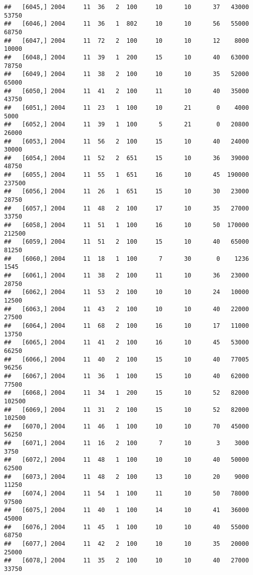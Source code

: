 \documentclass{article}\usepackage[]{graphicx}\usepackage[]{color}
\makeatletter
\newenvironment{kframe}{%
 \def\at@end@of@kframe{}%
 \ifinner\ifhmode%
  \def\at@end@of@kframe{\end{minipage}}%
  \begin{minipage}{\columnwidth}%
 \fi\fi%
 \def\FrameCommand##1{\hskip\@totalleftmargin \hskip-\fboxsep
 \colorbox{shadecolor}{##1}\hskip-\fboxsep
     \hskip-\linewidth \hskip-\@totalleftmargin \hskip\columnwidth}%
 \MakeFramed {\advance\hsize-\width
   \@totalleftmargin\z@ \linewidth\hsize
   \@setminipage}}%
 {\par\unskip\endMakeFramed%
 \at@end@of@kframe}
\newenvironment{knitrout}{}{} %
\makeatother
\begin{document}
\begin{knitrout}
\begin{kframe}
\begin{verbatim}
##   [6045,] 2004     11  36   2  100     10      10      37   43000   53750
##   [6046,] 2004     11  36   1  802     10      10      56   55000   68750
##   [6047,] 2004     11  72   2  100     10      10      12    8000   10000
##   [6048,] 2004     11  39   1  200     15      10      40   63000   78750
##   [6049,] 2004     11  38   2  100     10      10      35   52000   65000
##   [6050,] 2004     11  41   2  100     11      10      40   35000   43750
##   [6051,] 2004     11  23   1  100     10      21       0    4000    5000
##   [6052,] 2004     11  39   1  100      5      21       0   20800   26000
##   [6053,] 2004     11  56   2  100     15      10      40   24000   30000
##   [6054,] 2004     11  52   2  651     15      10      36   39000   48750
##   [6055,] 2004     11  55   1  651     16      10      45  190000  237500
##   [6056,] 2004     11  26   1  651     15      10      30   23000   28750
##   [6057,] 2004     11  48   2  100     17      10      35   27000   33750
##   [6058,] 2004     11  51   1  100     16      10      50  170000  212500
##   [6059,] 2004     11  51   2  100     15      10      40   65000   81250
##   [6060,] 2004     11  18   1  100      7      30       0    1236    1545
##   [6061,] 2004     11  38   2  100     11      10      36   23000   28750
##   [6062,] 2004     11  53   2  100     10      10      24   10000   12500
##   [6063,] 2004     11  43   2  100     10      10      40   22000   27500
##   [6064,] 2004     11  68   2  100     16      10      17   11000   13750
##   [6065,] 2004     11  41   2  100     16      10      45   53000   66250
##   [6066,] 2004     11  40   2  100     15      10      40   77005   96256
##   [6067,] 2004     11  36   1  100     15      10      40   62000   77500
##   [6068,] 2004     11  34   1  200     15      10      52   82000  102500
##   [6069,] 2004     11  31   2  100     15      10      52   82000  102500
##   [6070,] 2004     11  46   1  100     10      10      70   45000   56250
##   [6071,] 2004     11  16   2  100      7      10       3    3000    3750
##   [6072,] 2004     11  48   1  100     10      10      40   50000   62500
##   [6073,] 2004     11  48   2  100     13      10      20    9000   11250
##   [6074,] 2004     11  54   1  100     11      10      50   78000   97500
##   [6075,] 2004     11  40   1  100     14      10      41   36000   45000
##   [6076,] 2004     11  45   1  100     10      10      40   55000   68750
##   [6077,] 2004     11  42   2  100     10      10      35   20000   25000
##   [6078,] 2004     11  35   2  100     10      10      40   27000   33750

\end{verbatim}
\end{kframe}
\end{knitrout}
\end{document}
